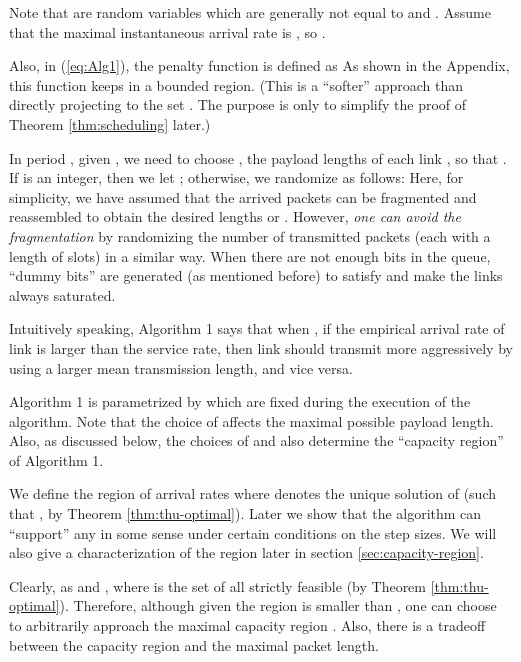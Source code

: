 \documentclass{IEEEtran}
\begin{document}
Note that  are random variables which
are generally not equal to  and .
Assume that the maximal instantaneous arrival rate is ,
so . 

Also, in (\ref{eq:Alg1}), the penalty function 
is defined as 
As shown in the Appendix, this function keeps  in a bounded
region. (This is a {}``softer'' approach than directly projecting
 to the set . The purpose is only to
simplify the proof of Theorem \ref{thm:scheduling} later.)

In period , given , we need to choose ,
the payload lengths of each link , so that .
If  is an integer, then we let ;
otherwise, we randomize  as follows: 
Here, for simplicity, we have assumed that the arrived packets can
be fragmented and reassembled to obtain the desired lengths 
or . However, \emph{one
can avoid the fragmentation} by randomizing the number of transmitted
packets (each with a length of  slots) in a similar way. When
there are not enough bits in the queue, {}``dummy bits'' are generated
(as mentioned before) to satisfy 
and make the links always saturated. \medskip{}


Intuitively speaking, Algorithm 1 says that when ,
if the empirical arrival rate of link  is larger than the service
rate, then link  should transmit more aggressively by using a
larger mean transmission length, and vice versa. 

Algorithm 1 is parametrized by  which are fixed
during the execution of the algorithm. Note that the choice of 
affects the maximal possible payload length. Also, as discussed below,
the choices of  and  also determine the {}``capacity
region'' of Algorithm 1.

We define the region of arrival rates
where  denotes the unique solution of
 (such that ,
by Theorem \ref{thm:thu-optimal}). Later we show that the algorithm
can {}``support'' any 
in some sense under certain conditions on the step sizes. We will
also give a characterization of the region 
later in section \ref{sec:capacity-region}.

Clearly,  as 
and , where  is the set of all
strictly feasible  (by Theorem \ref{thm:thu-optimal}).
Therefore, although given  the region 
is smaller than , one can choose  to
arbitrarily approach the maximal capacity region . Also,
there is a tradeoff between the capacity region and the maximal packet
length.

\medskip{}
\end{document}
